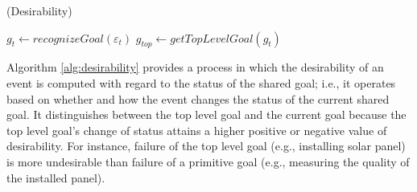 \begin{algorithm}[tbh]
	\caption{(Desirability)}
	\label{alg:desirability}
	\begin{algorithmic}[1]
			\Statex
			\State $\mathit{g}_{t} \gets \textit{recognizeGoal}{(\varepsilon_t)}$
			\State $\mathit{g}_{top} \gets \textit{getTopLevelGoal}{(\mathit{g}_{t})}$
			\Statex
			\State {} 
			\State {}
			\State {} 
				\Statex
				\State {}
				\State {}
				\State {}
				\State {}
				\EndIf
			\EndIf
		\EndFunction
	\end{algorithmic}
\end{algorithm}

Algorithm \ref{alg:desirability} provides a process in which the desirability of
an event is computed with regard to the status of the shared goal; i.e., it
operates based on whether and how the event changes the status of the current
shared goal. It distinguishes between the top level goal and the current goal
because the top level goal's change of status attains a higher positive or
negative value of desirability. For instance, failure of the top level goal
(e.g., installing solar panel) is more undesirable than failure of a primitive
goal (e.g., measuring the quality of the installed panel).


